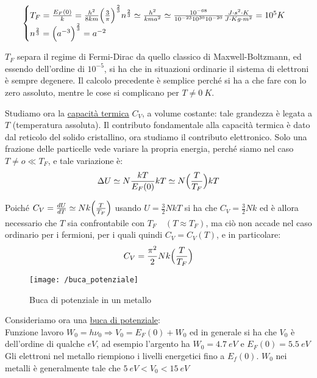 \begin{equation}
\begin{cases}
	T_F = \frac{ E_F(0)}{k} = \frac{ h^2}{8 k m} \Bigl(  \frac{ 3}{\pi}  \Bigr)^{ \frac{ 2}{3}} n^{ \frac{ 2}{3}} \simeq \frac{ h^2}{k m a^2} \simeq \frac{ 10^{ -68}}{10^{-23 } 10^{ 30} 10^{-20 }} \frac{ J \cdot s^2 \cdot K}{J \cdot Kg \cdot m^2} = 10^{5} K \\
	n^{ \frac{ 2}{3}} = \Bigl(  a^{ -3}  \Bigr)^{ \frac{ 2}{3}} = a^{ -2}
\end{cases}
\end{equation}

$T_F$ separa il regime di Fermi-Dirac da quello classico di Maxwell-Boltzmann, ed essendo dell'ordine di $10^{ -5}$, si ha che in situazioni ordinarie il sistema di elettroni è sempre degenere.
Il calcolo precedente è semplice perché si ha a che fare con lo zero assoluto, mentre le cose si complicano per $T \not =\SI{0}{K} $.

Studiamo ora la \underline{capacità termica} $C_V$, a volume costante: tale grandezza è legata a $T$ (temperatura assoluta).
Il contributo fondamentale alla capacità termica è dato dal reticolo del solido cristallino, ora studiamo il contributo elettronico.
Solo una frazione delle particelle vede variare la propria energia, perché siamo nel caso $T \not = o \ll T_F$, e tale variazione è:
$$ \Delta U \simeq N \frac{ k T}{E_F(0)} kT \simeq N\Bigl(  \frac{ T}{T_F}  \Bigr)kT $$

Poiché $C_V = \frac{ dU}{dT} \simeq N k \Bigl(  \frac{ T}{T_F}  \Bigr) $ usando $U = \frac{ 3}{2} N k T$ si ha che $C_V = \frac{ 3}{2} N k$ 
ed è allora necessario che $T$ sia confrontabile con $T_F \quad (T \approx T_F)$, ma ciò non accade nel caso ordinario per i fermioni,
per i quali quindi $C_V = C_V(T)$, e in particolare:
\begin{equation}
C_V = \frac{ \pi^2}{2} N k \Bigl(  \frac{ T}{T_F}  \Bigr)
\end{equation}

\begin{figure}[h]
\centering
\texttt{[image: /buca\_potenziale]}
\caption{Buca di potenziale in un metallo}
\end{figure}

Consideriamo ora una \underline{buca di potenziale}: \\

Funzione lavoro $W_0 = h\nu_0 \Rightarrow V_0 = E_F(0) + W_0$ ed in generale si ha che $V_0$ è dell'ordine di qualche $eV$,
ad esempio l'argento ha $W_0 = \SI{4.7}{eV}$ e $ E_F(0) = \SI{5.5}{eV} $
Gli elettroni nel metallo riempiono i livelli energetici fino a $E_f(0)$. 
$W_0$ nei metalli è generalmente tale che $\SI{5}{eV} < V_0 < \SI{15}{eV} $

